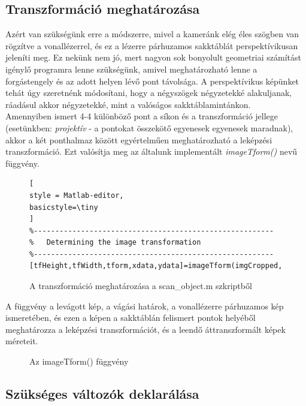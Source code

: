 \documentclass[12pt,a4paper]{article}
\begin{document}
\subsection{Transzformáció meghatározása}
Azért van szükségünk erre a módszerre, mivel a kameránk elég éles szögben van rögzítve a vonallézerrel, és ez a lézerre párhuzamos sakktáblát perspektívikusan jeleníti meg. Ez nekünk nem jó, mert nagyon sok bonyolult geometriai számítást igénylő programra lenne szükségünk, amivel meghatározható lenne a forgástengely és az adott helyen lévő pont távolsága. A perspektívikus képünket tehát úgy szeretnénk módosítani, hogy a négyszögek négyzetekké alakuljanak, ráadásul akkor négyzetekké, mint a valóságos sakktáblamintánkon.\\[10pt]
Amennyiben ismert 4-4 különböző pont a síkon és a transzformáció jellege (esetünkben: \textit{projektív} - a pontokat összekötő egyenesek egyenesek maradnak), akkor a két ponthalmaz között egyértelműen meghatározható a leképzési transzformáció. Ezt valósítja meg az általunk implementált \textit{imageTform()} nevű függvény.\\[10pt]
\begin{figure}[h!]
\centering
\begin{lstlisting}[
style = Matlab-editor,
basicstyle=\tiny
]
%--------------------------------------------------------
%   Determining the image transformation
%--------------------------------------------------------
[tfHeight,tfWidth,tform,xdata,ydata]=imageTform(imgCropped,rect,paralellImageNumber,cameraParams);
\end{lstlisting}
\caption{A transzformáció meghatározása a scan\_object.m szkriptből}
\end{figure}
A függvény a levágott kép, a vágási határok, a vonallézerre párhuzamos kép ismeretében, és ezen a képen a sakktáblán felismert pontok helyéből meghatározza a leképzési transzformációt, és a leendő áttranszformált képek méreteit.
\begin{figure}
\centering

\caption{Az imageTform() függvény}
\end{figure}

\subsection{Szükséges változók deklarálása}
\end{document}
